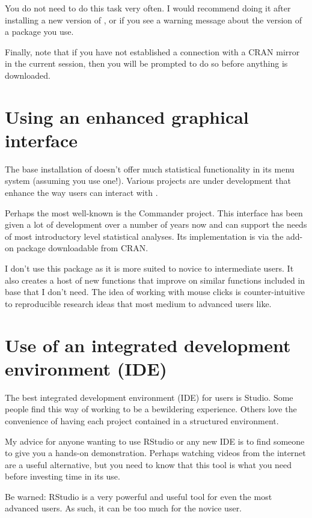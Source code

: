 You do not need to do this task very often. I would recommend doing it after installing a new version of \R{}, or if you see a warning message about the version of a package you use.

Finally, note that if you have not established a connection with a CRAN mirror in the current \R{} session, then you will be prompted to do so before anything is downloaded.

\section{Using an enhanced graphical interface}

The base installation of \R{} doesn't offer much statistical functionality in its menu system (assuming you use one!). Various projects are under development that enhance the way users can interact with \R{}.

Perhaps the most well-known is the \R{} Commander project. This interface has been given a lot of development over a number of years now and can support the needs of most introductory level statistical analyses. Its implementation is via the  add-on package downloadable from CRAN.

I don't use this package as it is more suited to novice to intermediate \R{} users. It also creates a host of new functions that improve on similar functions included in base \R{} that I don't need. The idea of working with mouse clicks is counter-intuitive to reproducible research ideas that most medium to advanced \R{} users like.

\section{Use of an integrated development environment (IDE)} 

The best integrated development environment (IDE) for \R{} users is \R{} Studio. Some people find this way of working to be a bewildering experience. Others love the convenience of having each project contained in a structured environment.

My advice for anyone wanting to use RStudio or any new IDE is to find someone to give you a hands-on demonstration. Perhaps watching videos from the internet are a useful alternative, but you need to know that this tool is what you need before investing time in its use.

Be warned: RStudio is a very powerful and useful tool for even the most advanced \R{} users. As such, it can be too much for the novice \R{} user.



